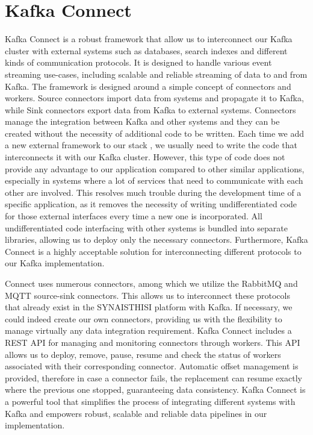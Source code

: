 \section{Kafka Connect}
\label{kafka_connect}
Kafka Connect \cite{KafkaConnect} is a robust framework that allow us to interconnect our Kafka cluster with external systems such as databases, search indexes and different kinds of communication protocols. It is designed to handle various event streaming use-cases, including scalable and reliable streaming of data to and from Kafka. The framework is designed around a simple concept of connectors and workers. Source connectors import data from systems and propagate it to Kafka, while Sink connectors export data from Kafka to external systems. Connectors manage the integration between Kafka and other systems and they can be created without the necessity of additional code to be written. Each time we add a new external framework to our stack , we usually need to write the code that interconnects it with our Kafka cluster. Ηowever, this type of code does not provide any advantage to our application compared to other similar applications, especially in systems where a lot of services that need to communicate with each other are involved. This resolves much trouble during the development time of a specific application, as it removes the necessity of writing undifferentiated code for those external interfaces every time a new one is incorporated. All undifferentiated code interfacing with other systems is bundled into separate libraries, allowing us to deploy only the necessary connectors. Furthermore, Kafka Connect is a highly acceptable solution for interconnecting different protocols to our Kafka implementation. 

Connect uses numerous connectors, among which we utilize the RabbitMQ and MQTT source-sink connectors. This allows us to interconnect these protocols that already exist in the SYNAISTHISI platform with Kafka. If necessary, we could indeed create our own connectors, providing us with the flexibility to manage virtually any data integration requirement. Kafka Connect includes a REST API for managing and monitoring connectors through workers. This API allows us to deploy, remove, pause, resume and check the status of workers associated with their corresponding connector. Automatic offset management is provided, therefore in case a connector fails, the replacement can resume exactly where the previous one stopped, guaranteeing data consistency. Kafka Connect is a powerful tool that simplifies the process of integrating different systems with Kafka and empowers robust, scalable and reliable data pipelines in our implementation. 

